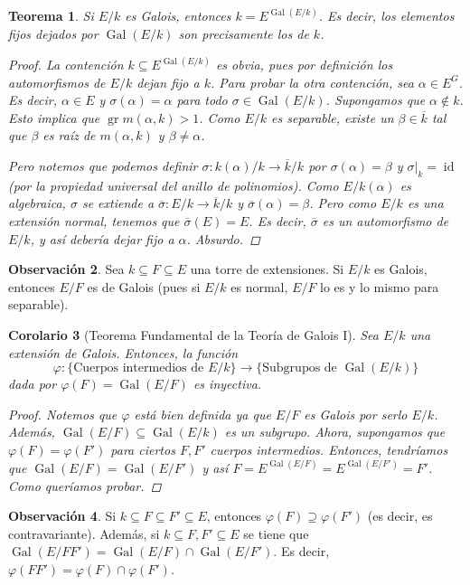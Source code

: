 \documentclass[12pt]{book}
\newtheorem{teo}{Teorema}[section]
\newtheorem{cor}[teo]{Corolario}
\theoremstyle{definition}
\newtheorem{obs}[teo]{Observación}
\DeclareMathOperator{\id}{id}
\DeclareMathOperator{\gr}{gr}
\DeclareMathOperator{\Gal}{Gal}
\begin{document}
\begin{teo}
Si $E/k$ es Galois, entonces $k = E^{\Gal(E/k)}$. Es decir, los elementos fijos dejados por $\Gal(E/k)$ son precisamente los de $k$.
\begin{proof}
La contención $k\subseteq E^{\Gal(E/k)}$ es obvia, pues por definición los automorfismos de $E/k$ dejan fijo a $k$. Para probar la otra contención, sea $\alpha\in E^G$. Es decir, $\alpha\in E$ y $\sigma(\alpha)=\alpha$ para todo $\sigma\in \Gal(E/k)$. Supongamos que $\alpha\notin k$. Esto implica que $\gr m(\alpha,k)>1$. Como $E/k$ es separable, existe un $\beta\in\overline{k}$ tal que $\beta$ es raíz de $m(\alpha,k)$ y $\beta\neq \alpha$.

Pero notemos que podemos definir $\sigma:k(\alpha)/k\to \overline{k}/k$ por $\sigma(\alpha)=\beta$ y $\left. \sigma\right|_{k}=\id$ (por la propiedad universal del anillo de polinomios). Como $E/k(\alpha)$ es algebraica, $\sigma$ se extiende a $\overline{\sigma}: E/k\to \overline{k}/k$ y $\overline{\sigma}(\alpha)=\beta$. Pero como $E/k$ es una extensión normal, tenemos que $\overline{\sigma}(E) = E$. Es decir, $\overline{\sigma}$ es un automorfismo de $E/k$, y así debería dejar fijo a $\alpha$. Absurdo.
\end{proof}
\end{teo}

\begin{obs}
Sea $k\subseteq F\subseteq E$ una torre de extensiones. Si $E/k$ es Galois, entonces $E/F$ es de Galois (pues si $E/k$ es normal, $E/F$ lo es y lo mismo para separable).
\end{obs}

\begin{cor}[Teorema Fundamental de la Teoría de Galois I]
Sea $E/k$ una extensión de Galois. Entonces, la función $$ \varphi:\{\text{Cuerpos intermedios de }E/k\}\to \{\text{Subgrupos de }\Gal(E/k)\}$$ dada por $\varphi(F)=\Gal(E/F)$ es inyectiva.
\begin{proof}
Notemos que $\varphi$ está bien definida ya que $E/F$ es Galois por serlo $E/k$. Además, $\Gal(E/F)\subseteq \Gal(E/k)$ es un subgrupo. Ahora, supongamos que $\varphi(F)=\varphi(F')$ para ciertos $F,F'$ cuerpos intermedios. Entonces, tendríamos que $\Gal(E/F) = \Gal(E/F')$ y así $F = E^{\Gal(E/F)} = E^{\Gal(E/F')} = F'$. Como queríamos probar.
\end{proof}
\end{cor}

\begin{obs}
Si $k\subseteq F\subseteq F'\subseteq E$, entonces $\varphi(F)\supseteq \varphi(F')$ (es decir, es contravariante). Además, si $k\subseteq F,F'\subseteq E$ se tiene que $\Gal(E/FF') = \Gal(E/F)\cap \Gal(E/F')$. Es decir, $\varphi(FF') = \varphi(F)\cap \varphi(F')$.
\end{obs}
\end{document}
